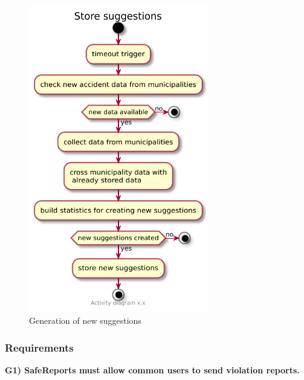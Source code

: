 \documentclass[a4paper]{article}
\begin{document}
\begin{figure}[H]
\centering
\includegraphics[width=0.7\textwidth]{activity_diagram_create_suggestions}
\caption{Generation of new suggestions}
\end{figure}

\subsubsection{Requirements}

\textbf{G1) SafeReports must allow common users to send violation
reports.}
\end{document}
